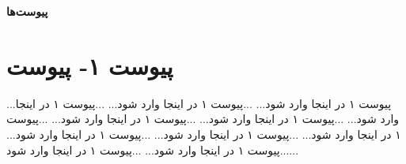 \thispagestyle{empty}
\centerline{\textbf{پیوست‌ها}}

\section*{پیوست ۱- پیوست }
...پیوست ۱ در اینجا وارد شود...
...پیوست ۱ در اینجا وارد شود...
...پیوست ۱ در اینجا وارد شود...
...پیوست ۱ در اینجا وارد شود...
...پیوست ۱ در اینجا وارد شود...
...پیوست ۱ در اینجا وارد شود...
...پیوست ۱ در اینجا وارد شود...
...پیوست ۱ در اینجا وارد شود...
...پیوست ۱ در اینجا وارد شود...
...پیوست ۱ در اینجا وارد شود...
